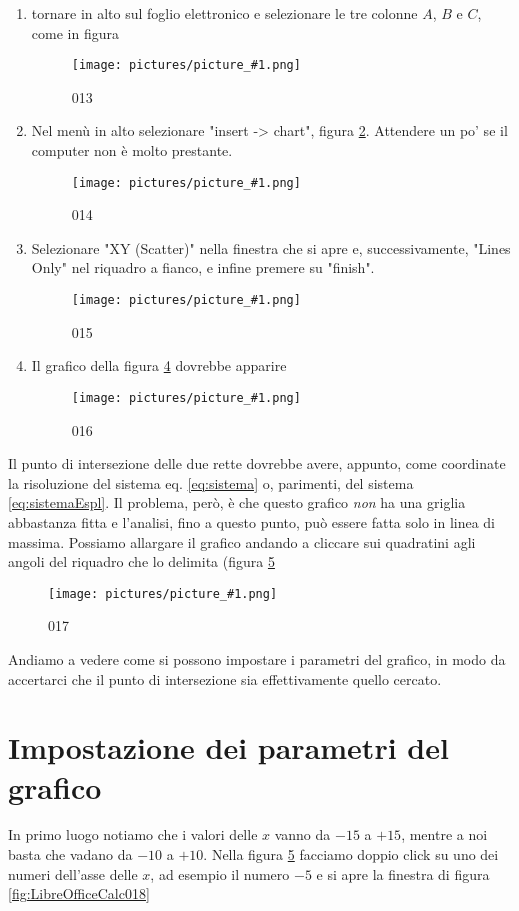 \documentclass[17pt]{extarticle}
\newcommand{\pict}[1]{
\begin{figure}[h!]		
	\centering
   	\texttt{[image: pictures/picture\_\#1.png]}
  	\caption{#1}
   	\label{fig:LibreOfficeCalc#1}
\end{figure}
}
\begin{document}
\begin{enumerate}
	\item tornare in alto sul foglio elettronico e selezionare le tre colonne $A$, $B$ e $C$, come in figura 
	
	\pict{013}	
		
	\item Nel menù in alto selezionare "insert -> chart", figura \ref{fig:LibreOfficeCalc014}. Attendere un po' se il computer non è molto prestante.
	
	\pict{014}	
	
	\item Selezionare "XY (Scatter)" nella finestra che si apre e, successivamente, "Lines Only" nel riquadro a fianco, e infine premere su "finish".
	
	\pict{015}
	
	\item Il grafico della figura \ref{fig:LibreOfficeCalc016} dovrebbe apparire

	\pict{016}

\end{enumerate}
Il punto di intersezione delle due rette dovrebbe avere, appunto, come coordinate la risoluzione del sistema eq. \ref{eq:sistema} o, parimenti, del sistema \ref{eq:sistemaEspl}. Il problema, però, è che questo grafico \emph{non} ha una griglia abbastanza fitta e l'analisi, fino a questo punto, può essere fatta solo in linea di massima. Possiamo allargare il grafico andando a cliccare sui quadratini agli angoli del riquadro che lo delimita (figura \ref{fig:LibreOfficeCalc017}


%
\pict{017}


Andiamo a vedere come si possono impostare i parametri del grafico, in modo da accertarci che il punto di intersezione sia effettivamente quello cercato.

\newpage

\section{Impostazione dei parametri del grafico}

In primo luogo notiamo che i valori delle $x$ vanno da $-15$ a $+15$, mentre a noi basta che vadano da $-10$ a $+10$. Nella figura \ref{fig:LibreOfficeCalc017} facciamo doppio click su uno dei numeri dell'asse delle $x$, ad esempio il numero $-5$ e si apre la finestra di figura \ref{fig:LibreOfficeCalc018}
\end{document}
